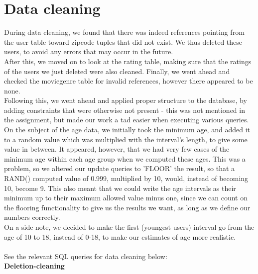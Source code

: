 \section*{Data cleaning}

During data cleaning, we found that there was indeed references pointing from the user table toward zipcode tuples that did not exist. We thus deleted these users, to avoid any errors that may occur in the future. \\
After this, we moved on to look at the rating table, making sure that the ratings of the users we just deleted were also cleaned. Finally, we went ahead and checked the moviegenre table for invalid references, however there appeared to be none. \\
Following this, we went ahead and applied proper structure to the database, by adding constraints that were otherwise not present - this was not mentioned in the assignment, but made our work a tad easier when executing various queries. \\
On the subject of the age data, we initially took the minimum age, and added it to a random value which was multiplied with the interval's length, to give some value in between. It appeared, however, that we had very few cases of the minimum age within each age group when we computed these ages. This was a problem, so we altered our update queries to 'FLOOR' the result, so that a RAND() computed value of 0.999, multiplied by 10, would, instead of becoming 10, become 9. This also meant that we could write the age intervals as their minimum up to their maximum allowed value minus one, since we can count on the flooring functionality to give us the results we want, as long as we define our numbers correctly. \\
On a side-note, we decided to make the first (youngest users) interval go from the age of 10 to 18, instead of 0-18, to make our estimates of age more realistic. \\
\\
See the relevant SQL queries for data cleaning below: \\

\noindent\textbf{Deletion-cleaning} \\

